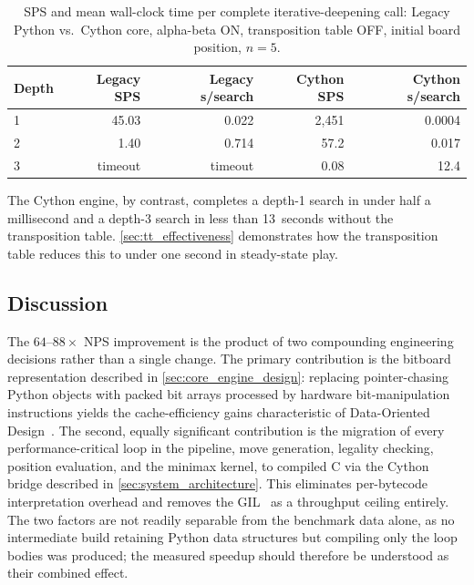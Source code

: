 \begin{table}[ht]
  \centering
  \caption{SPS and mean wall-clock time per complete iterative-deepening
    call: Legacy Python vs.\ Cython core, alpha-beta ON, transposition table OFF,
    initial board position, $n = 5$.}
  \label{tab:sps_comparison}
  \begin{tabular}{lrrrr}
    \hline
    \textbf{Depth} & \textbf{Legacy SPS} & \textbf{Legacy s/search}
                   & \textbf{Cython SPS} & \textbf{Cython s/search}                    \\
    \hline
    1              & 45.03               & 0.022                    & 2{,}451 & 0.0004 \\
    2              & 1.40                & 0.714                    & 57.2    & 0.017  \\
    3              & timeout             & timeout                  & 0.08    & 12.4   \\
    \hline
  \end{tabular}
\end{table}

The Cython engine, by contrast, completes a depth-1 search in under half a millisecond
and a depth-3 search in less than 13~seconds without the transposition table.
\cref{sec:tt_effectiveness} demonstrates how the transposition table reduces this
to under one second in steady-state play.

\subsection{Discussion}

The $64$--$88\times$ NPS improvement is the product of two compounding engineering decisions rather than a single change. The primary contribution is the bitboard representation described in
\cref{sec:core_engine_design}: replacing pointer-chasing Python objects with packed bit arrays processed by hardware bit-manipulation instructions yields the cache-efficiency gains characteristic of Data-Oriented Design~\cite{wingqvist2022dod,arantes2025impact,browne2014bitboards}. The second, equally significant contribution is the migration of every performance-critical loop in the pipeline, move generation, legality checking, position evaluation, and the minimax kernel, to compiled C via the Cython bridge described in \cref{sec:system_architecture}. This eliminates per-bytecode interpretation overhead and removes the GIL~\cite{beazley2010} as a throughput ceiling entirely. The two factors are not readily separable from the benchmark data alone, as no intermediate build retaining Python data structures but compiling only the loop bodies was produced; the measured speedup should therefore be understood as their combined effect.


